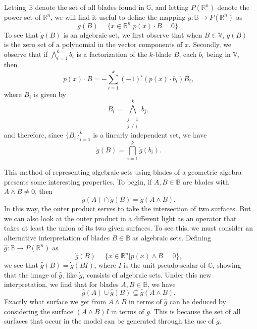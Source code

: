\documentclass{ecgd-l}
\numberwithin{equation}{section}
\newcommand{\R}{\mathbb{R}}
\newcommand{\B}{\mathbb{B}}
\newcommand{\G}{\mathbb{G}}
\newcommand{\V}{\mathbb{V}}
\newcommand{\gd}{\dot{g}}
\newcommand{\gh}{\hat{g}}
\begin{document}
Letting $\B$ denote the set of all blades found in $\G$,
and letting $P(\R^n)$ denote the power set of $\R^n$,
we will find it useful to define the mapping $\gd:\B\to P(\R^n)$ as
\begin{equation}\label{equ_gd}
\gd(B) = \{x\in\R^n|p(x)\cdot B=0\}.
\end{equation}
To see that $\gd(B)$ is an algebraic set, we first observe that when $B\in\V$,
$\gd(B)$ is the zero set of a polynomial in the vector components of $x$.
Secondly, we observe that if $\bigwedge_{i=1}^k b_i$ is a factorization
of the $k$-blade $B$, each $b_i$ being in $\V$, then
\begin{equation}\label{equ_expand_p_dot_B}
p(x)\cdot B = -\sum_{i=1}^k (-1)^i (p(x)\cdot b_i)B_i,
\end{equation}
where $B_i$ is given by
\begin{equation*}
B_i = \bigwedge_{\substack{j=1\\j\neq i}}^k b_j,
\end{equation*}
and therefore, since $\{B_i\}_{i=1}^k$ is a linearly independent set, we have
\begin{equation*}
\gd(B) = \bigcap_{i=1}^k \gd(b_i).
\end{equation*}

This method of representing algebraic sets using blades of a geometric algebra presents
some interesting properties.  To begin, if $A,B\in\B$ are blades with $A\wedge B\neq 0$,
then
\begin{equation*}
\gd(A)\cap\gd(B)=\gd(A\wedge B).
\end{equation*}
In this way, the outer product serves to take the intersection of two surfaces.  But we can also
look at the outer product in a different light as an operator that takes at least the union
of its two given surfaces.  To see this, we must consider an alternative interpretation
of blades $B\in\B$ as algebraic sets.  Defining $\gh:\B\to P(\R^n)$ as
\begin{equation}\label{equ_gh}
\gh(B)=\{x\in\R^n|p(x)\wedge B=0\},
\end{equation}
we see that $\gh(B)=\gd(BI)$, where $I$ is the unit pseudo-scalar of $\G$, showing
that the image of $\gh$, like $\gd$, consists of algebraic sets.
Under this new interpretation, we find that for blades $A,B\in\B$, we have
\begin{equation*}
\gh(A)\cup\gh(B)\subseteq\gh(A\wedge B).
\end{equation*}
Exactly what surface we get from $A\wedge B$ in terms of $\gh$ can
be deduced by considering the surface $(A\wedge B)I$ in terms of $\gd$.
This is because the set of all surfaces that occur in the model can be generated through the
use of $\gd$.
\end{document}
